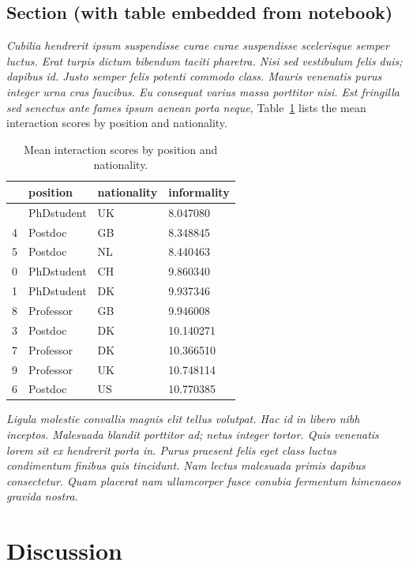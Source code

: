 \documentclass[
  10pt,
  a4paper,
]{scrbook}
\let\oldemph\emph
\renewcommand\emph[1]{\oldemph{\color{gray}#1}} %
\begin{document}
\section{Section (with table embedded from
notebook)}\label{section-with-table-embedded-from-notebook}

\emph{Cubilia hendrerit ipsum suspendisse curae curae suspendisse
scelerisque semper luctus. Erat turpis dictum bibendum taciti pharetra.
Nisi sed vestibulum felis duis; dapibus id. Justo semper felis potenti
commodo class. Mauris venenatis purus integer urna cras faucibus. Eu
consequat varius massa porttitor nisi. Est fringilla sed senectus ante
fames ipsum aenean porta neque,} Table~\ref{tbl-mean-informality} lists
the mean interaction scores by position and nationality.

\begin{longtable}[]{@{}llll@{}}

\caption{\label{tbl-mean-informality}Mean interaction scores by position
and nationality.}

\tabularnewline

\toprule\noalign{}
& position & nationality & informality \\
\midrule\noalign{}
\endhead
\bottomrule\noalign{}
\endlastfoot
2 & PhDstudent & UK & 8.047080 \\
4 & Postdoc & GB & 8.348845 \\
5 & Postdoc & NL & 8.440463 \\
0 & PhDstudent & CH & 9.860340 \\
1 & PhDstudent & DK & 9.937346 \\
8 & Professor & GB & 9.946008 \\
3 & Postdoc & DK & 10.140271 \\
7 & Professor & DK & 10.366510 \\
9 & Professor & UK & 10.748114 \\
6 & Postdoc & US & 10.770385 \\

\end{longtable}

\emph{Ligula molestie convallis magnis elit tellus volutpat. Hac id in
libero nibh inceptos. Malesuada blandit porttitor ad; netus integer
tortor. Quis venenatis lorem sit ex hendrerit porta in. Purus praesent
felis eget class luctus condimentum finibus quis tincidunt. Nam lectus
malesuada primis dapibus consectetur. Quam placerat nam ullamcorper
fusce conubia fermentum himenaeos gravida nostra.}

\chapter{Discussion}\label{discussion}
\end{document}
